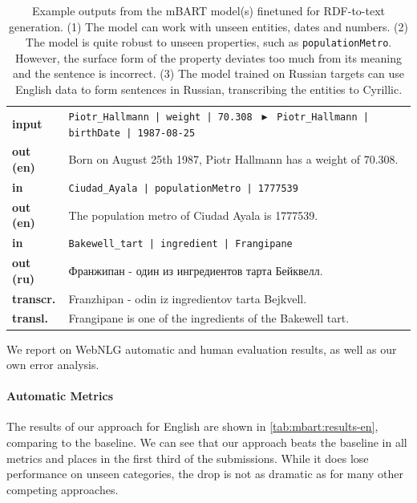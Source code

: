\begin{table}[t]
    \footnotesize
    \centering
    \begin{tabular}{@{}lp{12.7cm}@{}}
        \textbf{input}    & \texttt{Piotr\_Hallmann | weight | 70.308 }  $\blacktriangleright$ \texttt{ Piotr\_Hallmann | birthDate | 1987-08-25} \\
        \textbf{out (en)} & Born on August 25th 1987, Piotr Hallmann has a weight of 70.308.                                                      \\
        \midrule
        \textbf{in}       & \texttt{Ciudad\_Ayala | populationMetro | 1777539}                                                                    \\
        \textbf{out (en)} & The population metro of Ciudad Ayala is 1777539.                                                                      \\
        \midrule
        \textbf{in}       & \texttt{Bakewell\_tart | ingredient | Frangipane}                                                                     \\
        \textbf{out (ru)} & Франжипан - один из ингредиентов тарта Бейквелл.                                                                      \\[0.1cm]
        \textbf{transcr.} & Franzhipan - odin iz ingredientov tarta Bejkvell.                                                                     \\
        \textbf{transl.}  & Frangipane is one of the ingredients of the Bakewell tart.                                                            \\
    \end{tabular}
    \caption{Example outputs from the mBART model(s) finetuned for RDF-to-text generation. (1) The model can work with unseen entities, dates and numbers. (2) The model is quite robust to unseen properties, such as \texttt{populationMetro}. However, the surface form of the property deviates too much from its meaning and the sentence is incorrect. (3) The model trained on Russian targets can use English data to form sentences in Russian, transcribing the entities to Cyrillic.}
    \label{tab:mbart:examples}
\end{table}

We report on WebNLG automatic and human evaluation results, as well as our own error analysis.

\paragraph{Automatic Metrics}
The results of our approach for English are shown in \autoref{tab:mbart:results-en}, comparing to the baseline.
We can see that our approach beats the baseline in all metrics and places in the first third of the submissions. While it does lose performance on unseen categories, the drop is not as dramatic as for many other competing approaches.

